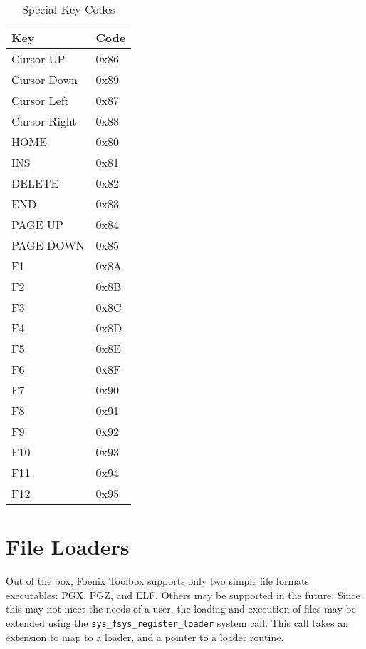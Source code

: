 \begin{table}[h]
    \begin{center}
        \begin{tabular}{|l|l|} \hline
            Key & Code \\ \hline\hline
            Cursor UP & 0x86 \\ \hline
            Cursor Down & 0x89 \\ \hline
            Cursor Left & 0x87 \\ \hline
            Cursor Right & 0x88 \\ \hline
            HOME & 0x80 \\ \hline
            INS & 0x81 \\ \hline
            DELETE & 0x82 \\ \hline
            END & 0x83 \\ \hline
            PAGE UP & 0x84 \\ \hline
            PAGE DOWN & 0x85 \\ \hline
            F1 & 0x8A \\ \hline
            F2 & 0x8B \\ \hline
            F3 & 0x8C \\ \hline
            F4 & 0x8D \\ \hline
            F5 & 0x8E \\ \hline
            F6 & 0x8F \\ \hline
            F7 & 0x90 \\ \hline
            F8 & 0x91 \\ \hline
            F9 & 0x92 \\ \hline
            F10 & 0x93 \\ \hline
            F11 & 0x94 \\ \hline
            F12 & 0x95 \\ \hline
        \end{tabular}
    \end{center}
    \caption{Special Key Codes}
    \label{tbl:special_key_codes}
\end{table}

\section{File Loaders}
Out of the box, Foenix Toolbox supports only two simple file formats executables: PGX, PGZ, and ELF. Others may be supported in the future. Since this may not meet the needs of a user, the loading and execution of files may be extended using the \verb+sys_fsys_register_loader+ system call. This call takes an extension to map to a loader, and a pointer to a loader routine.

